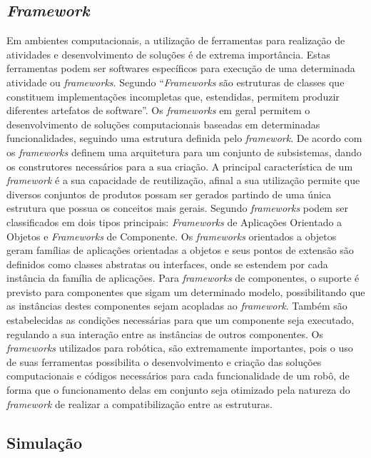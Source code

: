 \subsection{\textit{Framework}}\label{sec:framework}
Em ambientes computacionais, a utilização de ferramentas para realização de atividades e desenvolvimento de soluções é de extrema importância. Estas ferramentas podem ser softwares específicos para execução de uma determinada atividade ou \textit{frameworks}.	
Segundo \cite{maxwel_framework} “\textit{Frameworks} são estruturas de classes que constituem implementações incompletas que, estendidas, permitem produzir diferentes artefatos de software”. Os \textit{frameworks} em geral permitem o desenvolvimento de soluções computacionais baseadas em determinadas funcionalidades, seguindo uma estrutura definida pelo \textit{framework}. De acordo com \cite{maxwel_framework} os \textit{frameworks} definem uma arquitetura para um conjunto de subsistemas, dando os construtores necessários para a sua criação.
A principal característica de um \textit{framework} é a sua capacidade de reutilização, afinal a sua utilização permite que diversos conjuntos de produtos possam ser gerados partindo de uma única estrutura que possua os conceitos mais gerais.
Segundo \cite{maxwel_framework} \textit{frameworks} podem ser classificados em dois tipos principais: \textit{Frameworks} de Aplicações Orientado a Objetos e \textit{Frameworks} de Componente.
Os \textit{frameworks} orientados a objetos geram famílias de aplicações orientadas a objetos e seus pontos de extensão são definidos como classes abstratas ou interfaces, onde se estendem por cada instância da família de aplicações.
Para \textit{frameworks} de componentes, o suporte é previsto para componentes que sigam um determinado modelo, possibilitando que as instâncias destes componentes sejam acopladas ao \textit{framework}. Também são estabelecidas as condições necessárias para que um componente seja executado, regulando a sua interação entre as instâncias de outros componentes.
Os \textit{frameworks} utilizados para robótica, são extremamente importantes, pois o uso de suas ferramentas possibilita o desenvolvimento e criação das soluções computacionais e códigos necessários para cada funcionalidade de um robô, de forma que o funcionamento delas em conjunto seja otimizado pela natureza do \textit{framework} de realizar a compatibilização entre as estruturas.

\subsection{Simulação}\label{sec:simula}

